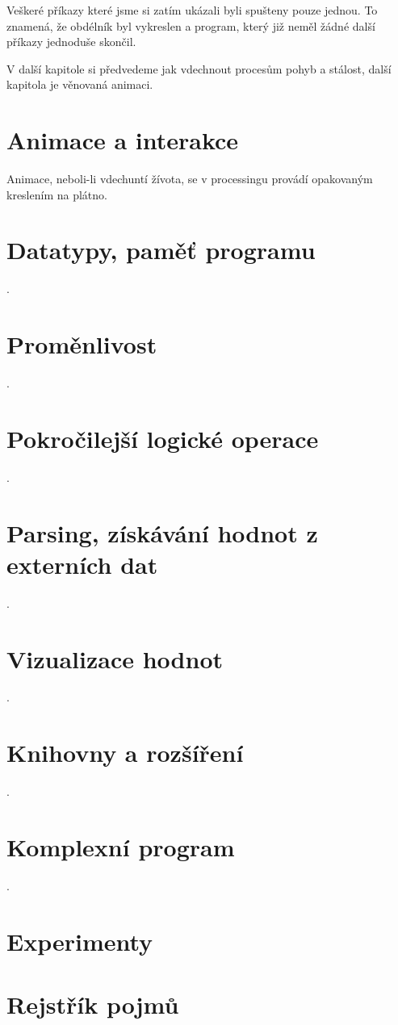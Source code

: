 \documentclass[11pt]{article}
\begin{document}
Veškeré příkazy které jsme si zatím ukázali byli spušteny pouze jednou. To znamená, že obdélník byl vykreslen a program, který již neměl žádné další příkazy jednoduše skončil.

V další kapitole si předvedeme jak vdechnout procesům pohyb a stálost, další kapitola je věnovaná animaci.

\section{Animace a interakce}

Animace, neboli-li vdechuntí žívota, se v processingu provádí opakovaným kreslením na plátno.

\newpage
\section{Datatypy, paměť programu}
.
\newpage
\section{Proměnlivost}
.
\newpage
\section{Pokročilejší logické operace}
.
\newpage
\section{Parsing, získávání hodnot z externích dat}
.
\newpage
\section{Vizualizace hodnot}
.
\newpage
\section{Knihovny a rozšíření}
.
\newpage
\section{Komplexní program}
.
\newpage
\section{Experimenty}


\newpage
\section{Rejstřík pojmů}
\end{document}
